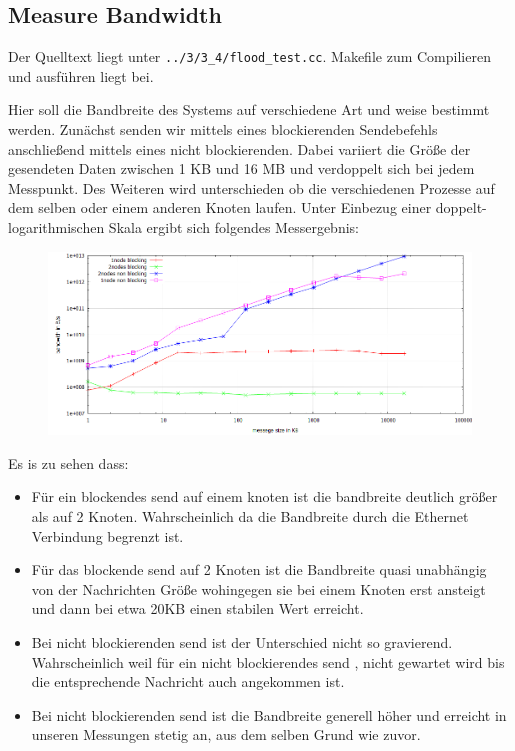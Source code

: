 \documentclass[a4paper,11pt]{scrartcl}
\begin{document}
\subsection{Measure Bandwidth}
Der Quelltext liegt unter \verb+../3/3_4/flood_test.cc+. Makefile zum Compilieren und ausführen liegt bei. 

Hier soll die Bandbreite des Systems auf verschiedene Art und weise bestimmt werden. Zunächst senden wir mittels eines blockierenden Sendebefehls anschließend mittels eines nicht blockierenden. Dabei variiert die Größe der gesendeten Daten zwischen 1 KB und 16 MB und verdoppelt sich bei jedem Messpunkt. Des Weiteren wird unterschieden ob die verschiedenen Prozesse auf dem selben oder einem anderen Knoten laufen. Unter Einbezug einer doppelt-logarithmischen Skala ergibt sich folgendes Messergebnis:


\begin{figure}[h!]
\includegraphics[width=\linewidth,
keepaspectratio]{3_4/bild}
\centering
\end{figure}


Es is zu sehen dass:
\begin{itemize}
\item Für ein blockendes send auf einem knoten ist die bandbreite deutlich größer als auf 2 Knoten. Wahrscheinlich da die Bandbreite durch die Ethernet Verbindung begrenzt ist.
\item Für das blockende send auf 2 Knoten ist die Bandbreite quasi unabhängig von der Nachrichten Größe wohingegen sie bei einem Knoten erst ansteigt und dann bei etwa 20KB einen stabilen Wert erreicht. 
\item Bei nicht blockierenden send ist der Unterschied nicht so gravierend. Wahrscheinlich weil für ein nicht blockierendes send , nicht gewartet wird bis die entsprechende Nachricht auch angekommen ist.
\item Bei nicht blockierenden send ist die Bandbreite generell höher und erreicht in unseren Messungen stetig an, aus dem selben Grund wie zuvor.
\end{itemize}
\end{document}
